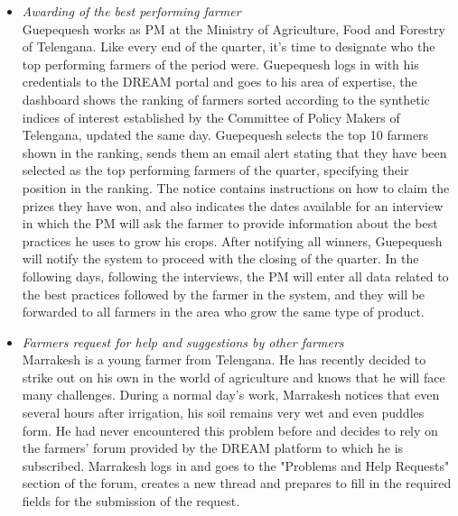 \documentclass[10pt]{article}
\begin{document}
\begin{itemize}
    \item \textit{Awarding of the best performing farmer}\\
    Guepequesh works as PM at the Ministry of Agriculture, Food and Forestry of Telengana. Like every end of the quarter,
     it's time to designate who the top performing farmers of the period were. Guepequesh logs in with his credentials to
      the DREAM portal and goes to his area of expertise, the dashboard shows the ranking of farmers sorted according to 
      the synthetic indices of interest established by the Committee of Policy Makers of Telengana, updated the same day. 
      Guepequesh selects the top 10 farmers shown in the ranking, sends them an email alert stating that they have been 
      selected as the top performing farmers of the quarter, specifying their position in the ranking. The notice contains 
      instructions on how to claim the prizes they have won, and also indicates the dates available for an interview in which 
      the PM will ask the farmer to provide information about the best practices he uses to grow his crops. After notifying 
      all winners, Guepequesh will notify the system to proceed with the closing of the quarter. In the following days, 
      following the interviews, the PM will enter all data related to the best practices followed by the farmer in the system, 
      and they will be forwarded to all farmers in the area who grow the same type of product. 
      \item \textit{Farmers request for help and suggestions by other farmers}\\
      Marrakesh is a young farmer from Telengana. He has recently decided to strike out on his own in the world of agriculture 
      and knows that he will face many challenges. During a normal day's work, Marrakesh notices that even several hours after irrigation, 
      his soil remains very wet and even puddles form. He had never encountered this problem before and decides to rely on the 
      farmers' forum provided by the DREAM platform to which he is subscribed. Marrakesh logs in and goes to the "Problems and Help Requests" 
      section of the forum, creates a new thread and prepares to fill in the required fields for the submission of the request. 

\end{itemize}
\end{document}
